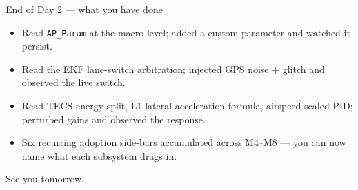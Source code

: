 \documentclass[aspectratio=169,11pt]{beamer}
\begin{document}
\begin{frame}{End of Day 2 --- what you have done}
  \begin{itemize}
    \item Read \texttt{AP\_Param} at the macro level; added a custom parameter and watched it persist.
    \item Read the EKF lane-switch arbitration; injected GPS noise + glitch and observed the live switch.
    \item Read TECS energy split, L1 lateral-acceleration formula, airspeed-scaled PID; perturbed gains and observed the response.
    \item Six recurring adoption side-bars accumulated across M4--M8 --- you can now name what each subsystem drags in.
  \end{itemize}
  \vfill
  \begin{center}\large See you tomorrow.\end{center}
\end{frame}
\end{document}

